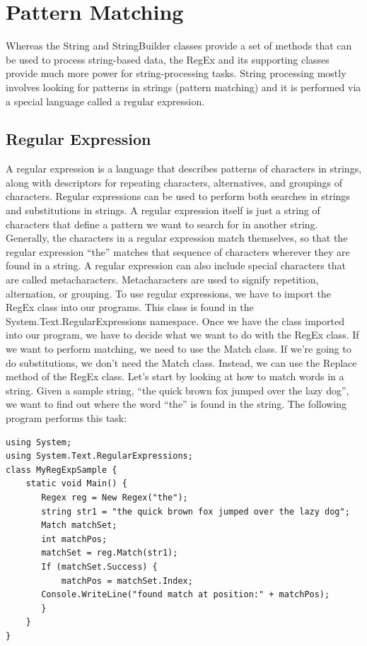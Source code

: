 \documentclass[12pt,a4paper,final,twoside,titlepage]{book}
\begin{document}
\section{Pattern Matching}
Whereas the String and StringBuilder classes provide a set of methods that can be used to process string-based data, the RegEx and its supporting classes provide much more power for string-processing tasks. String processing mostly involves looking for patterns in strings (pattern matching) and it is performed via a special language called a regular expression.
\subsection{Regular Expression}
A regular expression is a language that describes patterns of characters in strings, along with descriptors for repeating characters, alternatives, and groupings of characters. Regular expressions can be used to perform both searches in strings and substitutions in strings. A regular expression itself is just a string of characters that define a pattern we want to search for in another string. Generally, the characters in a regular expression match themselves, so that the regular expression “the” matches that sequence of characters wherever they are found in a string. A regular expression can also include special characters that are called metacharacters. Metacharacters are used to signify repetition, alternation, or grouping. To use regular expressions, we have to import the RegEx class into our programs. This class is found in the System.Text.RegularExpressions namespace. Once we have the class imported into our program, we have to decide what we want to do with the RegEx class. If we want to perform matching, we need to use the Match class. If we’re going to do substitutions, we don’t need the Match class. Instead, we can use the Replace method of the RegEx class. Let’s start by looking at how to match words in a string. Given a sample string, “the quick brown fox jumped over the lazy dog”, we want to find out where the word “the” is found in the string. The following program performs this task:
\begin{lstlisting}
using System;
using System.Text.RegularExpressions;
class MyRegExpSample {
	static void Main() {
       Regex reg = New Regex("the");
       string str1 = "the quick brown fox jumped over the lazy dog";
       Match matchSet;
       int matchPos;
       matchSet = reg.Match(str1); 
       If (matchSet.Success) {
           matchPos = matchSet.Index;
       Console.WriteLine("found match at position:" + matchPos);
	   }
	}
}
\end{lstlisting}
\end{document}
